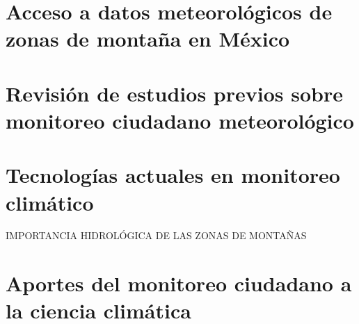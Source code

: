 \section{Acceso a datos meteorológicos  de zonas de montaña en México}

\section{Revisión de estudios previos sobre monitoreo ciudadano meteorológico}

\section{Tecnologías actuales en monitoreo climático}

IMPORTANCIA HIDROLÓGICA DE LAS ZONAS DE MONTAÑAS

\section{Aportes del monitoreo ciudadano a la ciencia climática}









